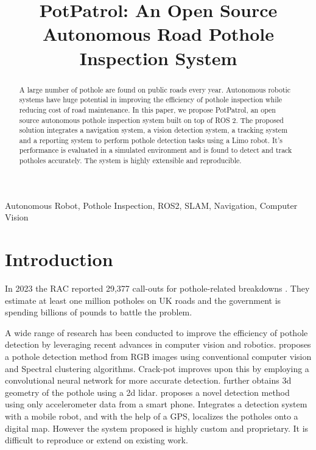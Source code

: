 \documentclass[conference]{IEEEtran}
\begin{document}
\title{PotPatrol: An Open Source Autonomous Road Pothole Inspection System}

\author{
}

\maketitle

\begin{abstract}
A large number of pothole are found on public roads every year. Autonomous robotic systems have huge potential in improving the efficiency of pothole inspection while reducing cost of road maintenance. In this paper, we propose PotPatrol, an open source autonomous pothole inspection system built on top of ROS 2. The proposed solution integrates a navigation system, a vision detection system, a tracking system and a reporting system to perform pothole detection tasks using a Limo robot. It's performance is evaluated in a simulated environment and is found to detect and track potholes accurately. The system is highly extensible and reproducible.
\end{abstract}

\begin{IEEEkeywords}
Autonomous Robot, Pothole Inspection, ROS2, SLAM, Navigation, Computer Vision
\end{IEEEkeywords}

\section{Introduction}

In 2023 the RAC reported 29,377 call-outs for pothole-related breakdowns \cite{RACPotholeIndex}. They estimate at least one million potholes on UK roads and the government is spending billions of pounds to battle the problem.

A wide range of research has been conducted to improve the efficiency of pothole detection by leveraging recent advances in computer vision and robotics. \cite{omanovicPotholeDetectionImage2013} proposes a pothole detection method from RGB images using conventional computer vision and Spectral clustering algorithms. Crack-pot \cite{anandCrackpotAutonomousRoad2018} improves upon this by employing a convolutional neural network for more accurate detection. \cite{kangPotholeDetectionSystem2017} further obtains 3d geometry of the pothole using a 2d lidar. \cite{RealTimePothole} proposes a novel detection method using only accelerometer data from a smart phone.
\cite{brunoRobotizedRaspberryBasedSystem2023} Integrates a detection system with a mobile robot, and with the help of a GPS, localizes the potholes onto a digital map. However the system proposed is highly custom and proprietary. It is difficult to reproduce or extend on existing work.
\end{document}
